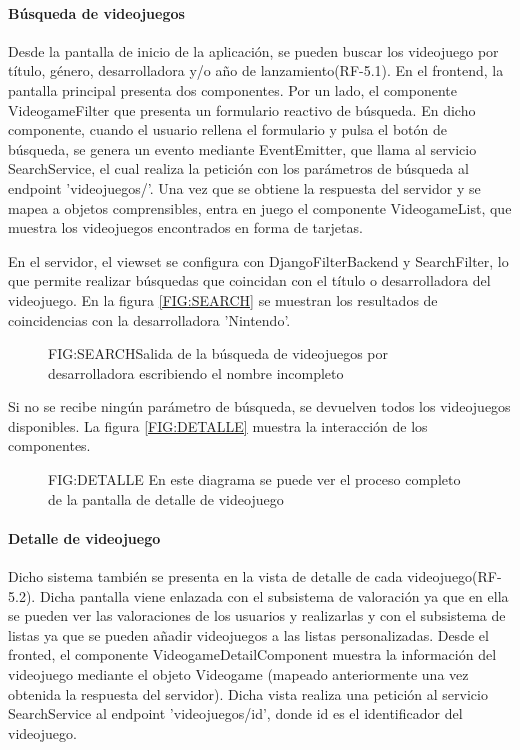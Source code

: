 \paragraph{Búsqueda de videojuegos}
Desde la pantalla de inicio de la aplicación, se pueden buscar los videojuego por título, género, desarrolladora y/o año de lanzamiento(RF-5.1).
En el frontend, la pantalla principal presenta dos componentes. Por un lado, el componente VideogameFilter que presenta un formulario reactivo de búsqueda.
En dicho componente, cuando el usuario rellena el formulario 
y pulsa el botón de búsqueda, se genera un evento mediante EventEmitter, que llama al servicio SearchService, el cual realiza 
la petición con los parámetros de búsqueda al endpoint 'videojuegos/'. Una vez que se obtiene la respuesta del servidor y se mapea a objetos comprensibles, 
entra en juego el componente VideogameList, que muestra los videojuegos encontrados en forma de tarjetas. 

En el servidor, el viewset se configura con DjangoFilterBackend y SearchFilter, lo que permite realizar búsquedas que coincidan con el título o 
desarrolladora del videojuego. En la figura \ref{FIG:SEARCH} se muestran los resultados de coincidencias con la desarrolladora 'Nintendo'.

\begin{figure}[Coincidencias en desarrolladora]{FIG:SEARCH}{Salida de la búsqueda de videojuegos por desarrolladora escribiendo el nombre incompleto}
\end{figure}
Si no se recibe ningún parámetro de búsqueda, se devuelven todos los videojuegos disponibles. La figura 
\ref{FIG:DETALLE} muestra la interacción de los componentes.

\begin{figure}[Componentes implicados para la pantalla de detalle de videojuego]{FIG:DETALLE}{ En este diagrama se puede ver el proceso completo de la pantalla de detalle de videojuego}
\end{figure}

\paragraph{Detalle de videojuego}
Dicho sistema también se presenta en la vista de detalle de cada videojuego(RF-5.2). Dicha pantalla viene enlazada con el subsistema de valoración 
ya que en ella se pueden ver las valoraciones de los usuarios y realizarlas y con el subsistema de listas ya que se pueden añadir videojuegos 
a las listas personalizadas. Desde el fronted, el componente VideogameDetailComponent muestra la información del videojuego mediante el objeto 
Videogame (mapeado anteriormente una vez obtenida la respuesta del servidor). Dicha vista realiza una petición al servicio SearchService al 
endpoint 'videojuegos/{id}', donde {id} es el identificador del videojuego.

